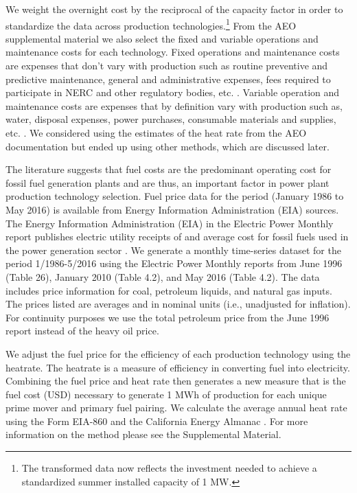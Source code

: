\documentclass[10pt]{amsart}
\begin{document}
We weight the overnight cost by the reciprocal of the capacity factor in order to standardize the data across production technologies.\footnote{The transformed data now reflects the investment needed to achieve a standardized summer installed capacity of 1 MW.}
From the AEO supplemental material we also select the fixed and variable operations and maintenance costs for each technology. 
Fixed operations and maintenance costs are expenses that don't vary with production such as routine preventive and predictive maintenance, general and administrative expenses, fees required to participate in NERC and other regulatory bodies, etc. \parencite{eiaupdatedcapital2010}.
Variable operation and maintenance costs are expenses that by definition vary with production such as, water, disposal expenses, power purchases, consumable materials and supplies, etc. \parencite{eiaupdatedcapital2010}. 
We considered using the estimates of the heat rate from the AEO documentation but ended up using other methods, which are discussed later. 

The literature suggests that fuel costs are the predominant operating cost for fossil fuel generation plants and are thus, an important factor in power plant production technology selection.
Fuel price data for the period (January 1986 to May 2016) is available from Energy Information Administration (EIA) sources.
The Energy Information Administration (EIA) in the Electric Power Monthly report publishes electric utility receipts of and average cost for fossil fuels used in the power generation sector \parencite{}.
We generate a monthly time-series dataset for the period 1/1986-5/2016 using the Electric Power Monthly reports from June 1996 (Table 26), January 2010 (Table 4.2), and May 2016 (Table 4.2). 
The data includes price information for coal, petroleum liquids, and natural gas inputs.
The prices listed are averages and in nominal units (i.e., unadjusted for inflation).
For continuity purposes we use the total petroleum price from the June 1996 report instead of the heavy oil price.  

We adjust the fuel price for the efficiency of each production technology using the heatrate.
The heatrate is a measure of efficiency in converting fuel into electricity. 
Combining the fuel price and heat rate then generates a new measure that is the fuel cost (USD) necessary to generate 1 MWh of production for each unique prime mover and primary fuel pairing. 
We calculate the average annual heat rate using the Form EIA-860 and the California Energy Almanac \parencite{cec2016}.
For more information on the method please see the Supplemental Material.
\end{document}
